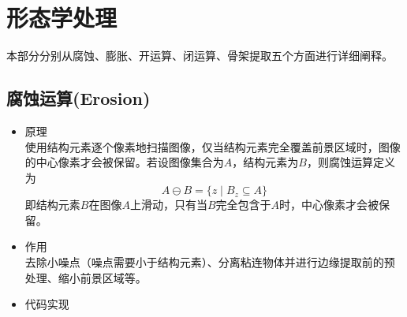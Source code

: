 \documentclass[11pt]{article}
\begin{document}
    \newpage

    
    \section{形态学处理}
    本部分分别从腐蚀、膨胀、开运算、闭运算、骨架提取五个方面进行详细阐释。
    \subsection{腐蚀运算(Erosion)}
    \begin{itemize}
    	\item 原理\\
    	使用结构元素逐个像素地扫描图像，仅当结构元素完全覆盖前景区域时，图像的中心像素才会被保留。若设图像集合为$A$，结构元素为$B$，则腐蚀运算定义为
    	$$A\ominus B = \{z\mid B_z\subseteq A\}$$
    	即结构元素$B$在图像$A$上滑动，只有当$B$完全包含于$A$时，中心像素才会被保留。
    	\item 作用\\
    	去除小噪点（噪点需要小于结构元素）、分离粘连物体并进行边缘提取前的预处理、缩小前景区域等。
    	\item 代码实现
    	\begin{center}
    	\end{center}
    \end{itemize}
\end{document}
